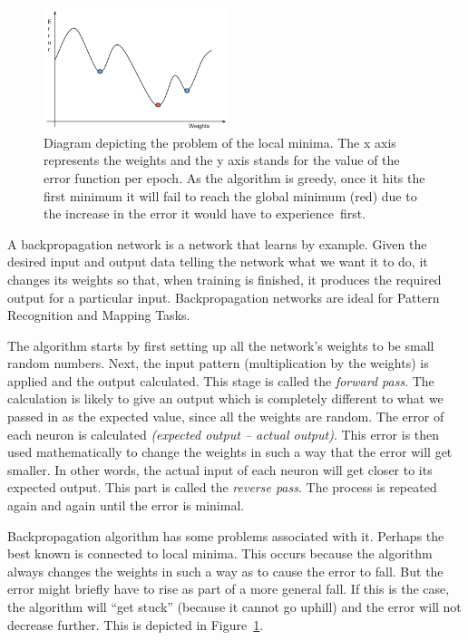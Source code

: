 \begin{figure}
  \vspace{-30pt}
  \begin{center}
    \includegraphics[width=0.48\textwidth]{Figures/localminima}
  \end{center}
  \caption{Diagram depicting the problem of the local minima. The x axis represents the weights and the y axis stands for the value of the error function per epoch. As the algorithm is greedy, once it hits the first minimum it will fail to reach the global minimum (red) due to the increase in the error it would have to experience~first.}
  \label{fig:localminima}
\end{figure}

A backpropagation network is a network that learns by example. Given the desired input and output data telling the network what we want it to do, it changes its weights so that, when training is finished, it produces the required output for a particular input. Backpropagation networks are ideal for Pattern Recognition and Mapping Tasks.

The algorithm starts by first setting up all the network's weights to be small random numbers. Next, the input pattern (multiplication by the weights) is applied and the output calculated. This stage is called the \textit{forward pass}. The calculation is likely to give an output which is completely different to what we passed in as the expected value, since all the weights are random. The error of each neuron is calculated \textit{(expected output -- actual output)}. This error is then used mathematically to change the weights in such a way that the error will get smaller. In other words, the actual input of each neuron will get closer to its expected output. This  part is called the \textit{reverse pass}. The process is repeated again and again until the error is minimal.

Backpropagation algorithm has some problems associated with it. Perhaps the best known is connected to local minima. This occurs because the algorithm always changes the weights in such a way as to cause the error to fall. But the error might briefly have to rise as part of a more general fall. If this is the case, the algorithm will ``get stuck'' (because it cannot go uphill) and the error will not decrease further. This is depicted in Figure~\ref{fig:localminima}.

